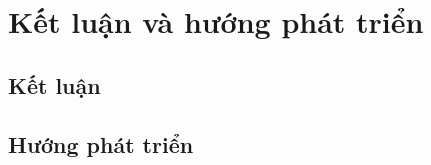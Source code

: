 \chapter{Kết luận và hướng phát triển}
\label{Chapter5}

\section{Kết luận}
\section{Hướng phát triển}
